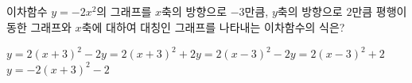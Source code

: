 이차함수 $y=-2x^2$의 그래프를 $x$축의 방향으로 $-3$만큼, $y$축의 방향으로 $2$만큼 평행이동한 그래프와 $x$축에 대하여 대칭인 그래프를 나타내는 이차함수의 식은?
\begin{choicesii}{$y=2(x+3)^2-2$}{$y=2(x+3)^2+2$}{$y=2(x-3)^2-2$}{$y=2(x-3)^2+2$}{$y=-2(x+3)^2-2$}\end{choicesii}
